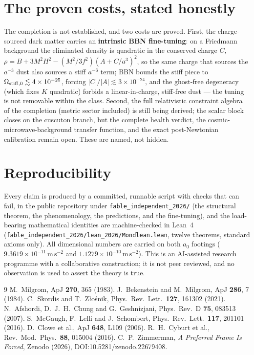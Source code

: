 \documentclass[11pt,letterpaper]{article}
\newcommand{\ms}{\,\mathrm{m\,s^{-2}}}
\begin{document}
\section{The proven costs, stated honestly}
The completion is not established, and two costs are proved. First, the charge-sourced dark matter carries an
\textbf{intrinsic BBN fine-tuning}: on a Friedmann background the eliminated density is quadratic in the
conserved charge $C$, $\rho=B+3M^2H^2-(M^2/3f^2)(A+C/a^3)^2$, so the same charge that sources the $a^{-3}$
dust also sources a stiff $a^{-6}$ term; BBN bounds the stiff piece to $\Omega_{\rm stiff,0}\lesssim
4\times10^{-25}$, forcing $|C|/|A|\lesssim3\times10^{-24}$, and the ghost-free degeneracy (which fixes $K$
quadratic) forbids a linear-in-charge, stiff-free dust --- the tuning is not removable within the class.
Second, the full relativistic constraint algebra of the completion (metric sector included) is still being
derived; the scalar block closes on the cuscuton branch, but the complete health verdict, the
cosmic-microwave-background transfer function, and the exact post-Newtonian calibration remain open. These
are named, not hidden.

\section{Reproducibility}
Every claim is produced by a committed, runnable script with checks that can fail, in the public repository
under \texttt{fable\_independent\_2026/} (the structural theorem, the phenomenology, the predictions, and the
fine-tuning), and the load-bearing mathematical identities are machine-checked in Lean~4
(\texttt{fable\_independent\_2026/lean\_2026/Mondlean.lean}, twelve theorems, standard axioms only). All
dimensional numbers are carried on both $a_0$ footings ($9.3619\times10^{-11}\ms$ and
$1.1279\times10^{-10}\ms$). This is an AI-assisted research programme with a collaborative construction; it
is not peer reviewed, and no observation is used to assert the theory is true.

\begin{thebibliography}{9}
 M.~Milgrom, ApJ \textbf{270}, 365 (1983).
 J.~Bekenstein and M.~Milgrom, ApJ \textbf{286}, 7 (1984).
 C.~Skordis and T.~Z\l{}o\'snik, Phys.\ Rev.\ Lett.\ \textbf{127}, 161302 (2021).
 N.~Afshordi, D.~J.~H.~Chung and G.~Geshnizjani, Phys.\ Rev.\ D \textbf{75}, 083513 (2007).
 S.~McGaugh, F.~Lelli and J.~Schombert, Phys.\ Rev.\ Lett.\ \textbf{117}, 201101 (2016).
 D.~Clowe et al., ApJ \textbf{648}, L109 (2006).
 R.~H.~Cyburt et al., Rev.\ Mod.\ Phys.\ \textbf{88}, 015004 (2016).
 C.~P.~Zimmerman, \emph{A Preferred Frame Is Forced}, Zenodo (2026), DOI:10.5281/zenodo.22679408.
\end{thebibliography}
\end{document}
